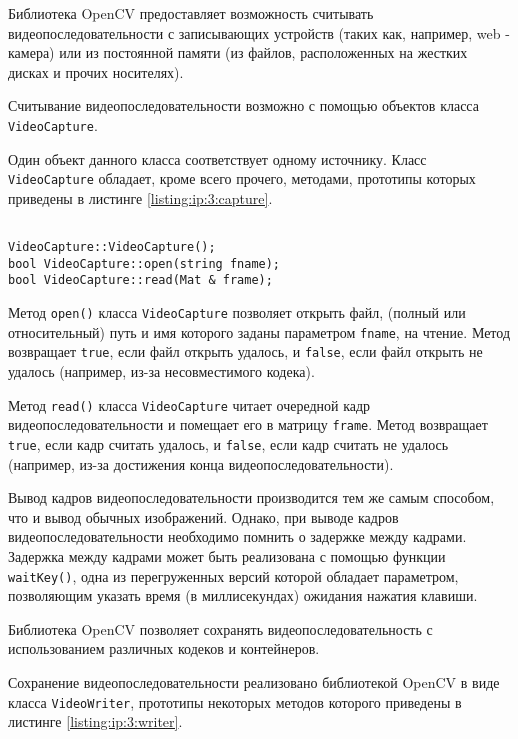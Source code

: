
Библиотека OpenCV предоставляет возможность считывать видеопоследовательности с записывающих устройств (таких как, например, web - камера) или из постоянной памяти (из файлов, расположенных на жестких дисках и прочих носителях).

Считывание видеопоследовательности возможно с помощью объектов класса \verb|VideoCapture|.

Один объект данного класса соответствует одному источнику. Класс \verb|VideoCapture| обладает, кроме всего прочего, методами, прототипы которых приведены в листинге \ref{listing:ip:3:capture}.

\begin{lstlisting}

VideoCapture::VideoCapture();
bool VideoCapture::open(string fname);
bool VideoCapture::read(Mat & frame);

\end{lstlisting}
\mylistingend

Метод \verb|open()| класса \verb|VideoCapture| позволяет открыть файл, (полный или относительный) путь и имя которого заданы параметром \verb|fname|, на чтение. Метод возвращает \verb|true|, если файл открыть удалось, и \verb|false|, если файл открыть не удалось (например, из-за несовместимого кодека).

Метод \verb|read()| класса \verb|VideoCapture| читает очередной кадр видеопоследовательности и помещает его в матрицу \verb|frame|. Метод возвращает \verb|true|, если кадр считать удалось, и \verb|false|, если кадр считать не удалось (например, из-за достижения конца видеопоследовательности).

Вывод кадров видеопоследовательности производится тем же самым способом, что и вывод обычных изображений. Однако, при выводе кадров видеопоследовательности необходимо помнить о задержке между кадрами. Задержка между кадрами может быть реализована с помощью функции \verb|waitKey()|, одна из перегруженных версий которой обладает параметром, позволяющим указать время (в миллисекундах) ожидания нажатия клавиши.


Библиотека OpenCV позволяет сохранять видеопоследовательность с использованием различных кодеков и контейнеров.

Сохранение видеопоследовательности реализовано библиотекой OpenCV в виде класса \verb|VideoWriter|, прототипы некоторых методов которого приведены в листинге \ref{listing:ip:3:writer}.

